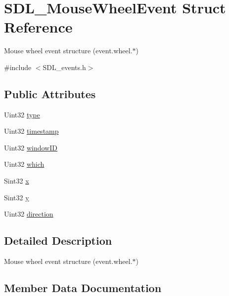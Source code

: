 \hypertarget{struct_s_d_l___mouse_wheel_event}{}\section{S\+D\+L\+\_\+\+Mouse\+Wheel\+Event Struct Reference}
\label{struct_s_d_l___mouse_wheel_event}


Mouse wheel event structure (event.\+wheel.$\ast$)  




{\ttfamily \#include $<$S\+D\+L\+\_\+events.\+h$>$}

\subsection*{Public Attributes}
\begin{DoxyCompactItemize}
\item 
Uint32 \mbox{\hyperlink{struct_s_d_l___mouse_wheel_event_aa6b741e99df708c6f9550ee0f520fb70}{type}}
\item 
Uint32 \mbox{\hyperlink{struct_s_d_l___mouse_wheel_event_a83ad52c80ff49a8e75dc6c33bba65fa0}{timestamp}}
\item 
Uint32 \mbox{\hyperlink{struct_s_d_l___mouse_wheel_event_ab45eb1895217214ecb773fc555e08f6c}{window\+ID}}
\item 
Uint32 \mbox{\hyperlink{struct_s_d_l___mouse_wheel_event_a014dc767d52e8b75ba26a5f12e1704e8}{which}}
\item 
Sint32 \mbox{\hyperlink{struct_s_d_l___mouse_wheel_event_a6d904eef474ea45a5b1828fcb5b0f859}{x}}
\item 
Sint32 \mbox{\hyperlink{struct_s_d_l___mouse_wheel_event_a53fdf77a464426bc8b30e629795f044b}{y}}
\item 
Uint32 \mbox{\hyperlink{struct_s_d_l___mouse_wheel_event_a9fc46552d116499e5b8ca89d66df932c}{direction}}
\end{DoxyCompactItemize}


\subsection{Detailed Description}
Mouse wheel event structure (event.\+wheel.$\ast$) 

\subsection{Member Data Documentation}
\mbox{\label{struct_s_d_l___mouse_wheel_event_a9fc46552d116499e5b8ca89d66df932c}} 
